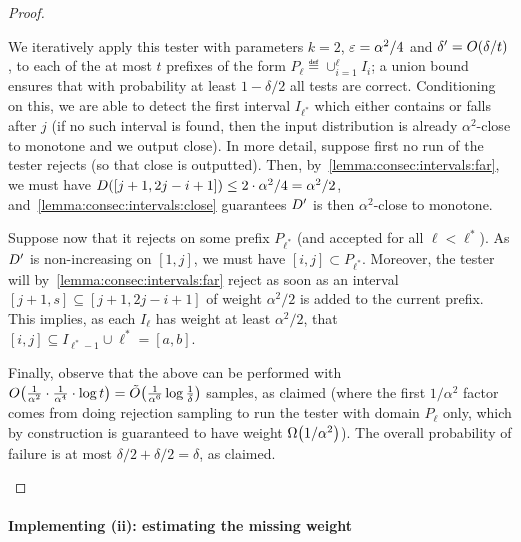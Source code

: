 \begin{proof}
\begin{itemize}
  We iteratively apply this tester with parameters $k=2$, $\varepsilon=\alpha^2/4$ and $\delta^\prime=\bigO{\delta/t}$, to each of the at most $t$ prefixes of the form $P_\ell\eqdef \cup_{i=1}^\ell I_i$; a union bound ensures that with probability at least $1-\delta/2$ all tests are correct. Conditioning on this, we are able to detect the first interval $I_{\ell^\ast}$ which either contains or falls after $j$ (if no such interval is found, then the input distribution is already $\alpha^2$-close to monotone and we output \textsf{close}).   
  In more detail, suppose first no run of the tester rejects (so that \textsf{close} is outputted). Then, by~\autoref{lemma:consec:intervals:far}, we must have $D([j+1,2j-i+1])\leq 2\cdot\alpha^2/4=\alpha^2/2$, and~\autoref{lemma:consec:intervals:close} guarantees $D^\prime$ is then $\alpha^2$-close to monotone.
  
  Suppose now that it rejects on some prefix $P_{\ell^\ast}$ (and accepted for all $\ell < \ell^\ast$). As $D^\prime$ is non-increasing on $[1,j]$, we must have $[i,j]\subset P_{\ell^\ast}$. Moreover, the tester will by~\autoref{lemma:consec:intervals:far} reject as soon as an interval $[j+1,s]\subseteq [j+1,2j-i+1]$ of weight $\alpha^2/2$ is added to the current prefix. This implies, as each $I_\ell$ has weight at least $\alpha^2/2$, that $[i,j]\subseteq I_{\ell^\ast-1}\cup {\ell^\ast}=[a,b]$.
  
  Finally, observe that the above can be performed with $\bigO{\frac{1}{\alpha^2}\cdot \frac{1}{\alpha^4} \cdot \log t}=\tildeO{\frac{1}{\alpha^6}\log\frac{1}{\delta}}$ samples, as claimed (where the first $1/\alpha^2$ factor comes from doing rejection sampling to run the tester with domain $P_\ell$ only, which by construction is guaranteed to have weight $\bigOmega{1/\alpha^2}$). The overall probability of failure is at most $\delta/2+\delta/2=\delta$, as claimed.
  \end{itemize} 
\end{proof}

\paragraph{Implementing \textsf{(ii)}: estimating the missing weight}

